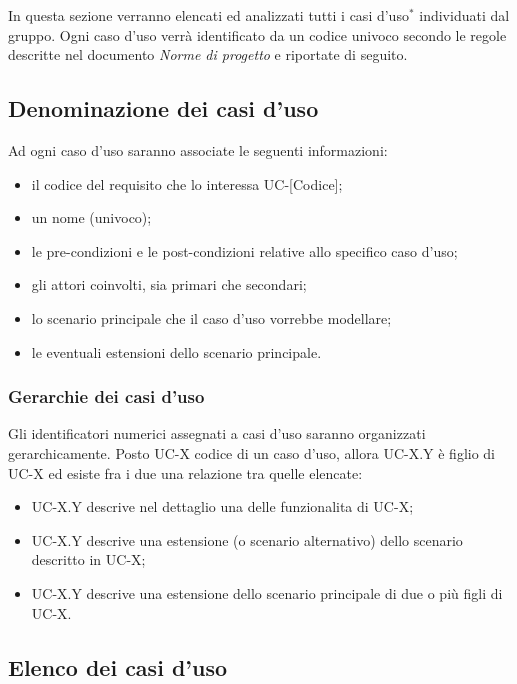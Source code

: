 In questa sezione verranno elencati ed analizzati tutti i casi d'uso$^*$ individuati dal gruppo. Ogni caso d'uso verrà identificato da un codice univoco secondo le regole descritte nel documento \textit{Norme di progetto} e riportate di seguito. 
\subsection{Denominazione dei casi d'uso}
Ad ogni caso d'uso saranno associate le seguenti informazioni:
\begin{itemize}
\item il codice del requisito che lo interessa UC-[Codice];
\item un nome (univoco);
\item le pre-condizioni e le post-condizioni relative allo specifico caso d'uso;
\item gli attori coinvolti, sia primari che secondari;
\item lo scenario principale che il caso d'uso vorrebbe modellare;
\item le eventuali estensioni dello scenario principale.
\end{itemize}

\subsubsection{Gerarchie dei casi d'uso} 

Gli identificatori numerici assegnati a casi d'uso saranno organizzati gerarchicamente. Posto UC-X codice di un caso d'uso, allora UC-X.Y è figlio di UC-X ed esiste fra i due una relazione tra quelle elencate:
\begin{itemize}
\item UC-X.Y descrive nel dettaglio una delle funzionalita di UC-X;
\item UC-X.Y descrive una estensione (o scenario alternativo) dello scenario descritto in UC-X; 
\item UC-X.Y descrive una estensione dello scenario principale di due o più figli di UC-X.
\end{itemize}

\subsection{Elenco dei casi d'uso}
